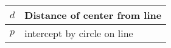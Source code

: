 \begin{tabular}{|l|l|}
\hline
    $d$ & Distance of center from line \\
    \hline
    $p$ & intercept by circle on line\\
    \hline
\end{tabular}